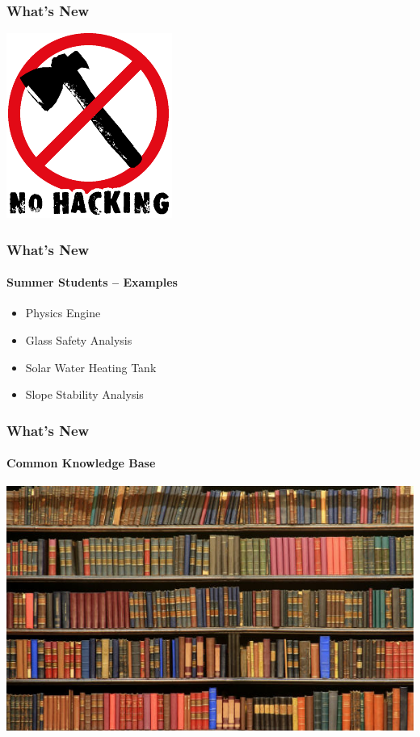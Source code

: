 \documentclass{beamer}
\begin{document}
\begin{frame}

\frametitle{What's New}

\begin{center}
\includegraphics{no_hacking.png}
\end{center}

\end{frame}


\begin{frame}

\frametitle{What's New}
\framesubtitle{Summer Students -- Examples}

\begin{itemize}
\item Physics Engine
\item Glass Safety Analysis
\item Solar Water Heating Tank
\item Slope Stability Analysis
\end{itemize}

\end{frame}


\begin{frame}

\frametitle{What's New}
\framesubtitle{Common Knowledge Base}

\begin{center}
\includegraphics[width=\textwidth]{books.jpg}
\end{center}

\end{frame}
\end{document}

